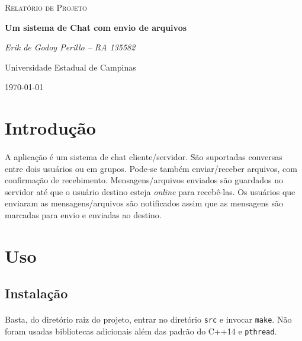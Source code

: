 \documentclass[11pt]{article}
\newcommand{\tit}[1]{\textit{#1}}
\newcommand{\ttt}[1]{\texttt{#1}}
\begin{document}
\begin{titlepage}
	\centering
	{\scshape\Large Relatório de Projeto\par}
	\vspace{1.5cm}
	{\huge\bfseries Um sistema de Chat com envio de arquivos\par}
	\vspace{1cm}
	{\itshape Erik de Godoy Perillo -- RA 135582\par}
	\vspace{0.5cm}
	\begin{abstract}
		Neste relatório, serão descritas as funcionalidades e decisões de
		implementação do sistema de Chat para a disciplina
		MC833 -- Laboratório de Redes.
	\end{abstract}
	\vfill
	Universidade Estadual de Campinas 
	\vfill
	{\large \today\par}
\end{titlepage}

\newpage

\tableofcontents

\newpage

\section{Introdução}
\paragraph{}
A aplicação é um sistema de chat cliente/servidor. 
São suportadas conversas entre dois usuários ou em grupos.
Pode-se também enviar/receber arquivos, com confirmação de recebimento.
Mensagens/arquivos enviados são guardados no servidor até que o usuário
destino esteja \tit{online} para recebê-las.
Os usuários que enviaram as mensagens/arquivos são notificados assim que
as mensagens são marcadas para envio e enviadas ao destino.

\section{Uso}
\subsection{Instalação}
\paragraph{}
Basta, do diretório raiz do projeto, entrar no diretório \ttt{src} e invocar
\ttt{make}. Não foram usadas bibliotecas adicionais além das padrão do C++14
e \ttt{pthread}.
\end{document}
